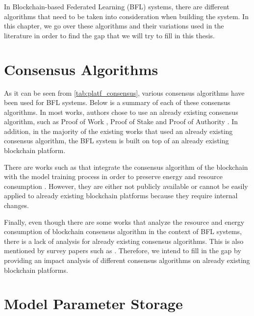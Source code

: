 In Blockchain-based Federated Learning (BFL) systems, there are different algorithms that need to be taken into consideration when building the system. In this chapter, we go over these algorithms and their variations used in the literature in order to find the gap that we will try to fill in this thesis.

\section{Consensus Algorithms}\label{related_work:consensus_algorithms}

As it can be seen from \autoref{tab:platf_consensus}, various consensus algorithms have been used for BFL systems. Below is a summary of each of these consensus algorithms. In most works, authors chose to use an already existing consensus algorithm, such as Proof of Work \cite{10.48550/arxiv.2007.03856, 9233457, 8733825, 10.48550/arxiv.2112.07938, 9134967, 10.48550/arxiv.1912.04859, 9079513, 9223754, 9399813}, Proof of Stake \cite{9159643, 10.48550/arxiv.2101.03300, 8998397, 10.48550/arxiv.1912.04859, 9399813, 9170559, 9311394, 9170905} and Proof of Authority \cite{9274451, baffle, demo, 8945913}. In addition, in the majority of the existing works that used an already existing consensus algorithm, the BFL system is built on top of an already existing blockchain platform.

There are works such as \cite{9347812, 10.48550/arxiv.2007.15145, 8843900} that integrate the consensus algorithm of the blockchain with the model training process in order to preserve energy and resource consumption \cite{9293091}. However, they are either not publicly available or cannot be easily applied to already existing blockchain platforms because they require internal changes.

Finally, even though there are some works that analyze the resource and energy consumption of blockchain consensus algorithm in the context of BFL systems, there is a lack of analysis for already existing consensus algorithms. This is also mentioned by survey papers such as \cite{9403374, 10.48550/arxiv.2112.07938}. Therefore, we intend to fill in the gap by providing an impact analysis of different consensus algorithms on already existing blockchain platforms.

\section{Model Parameter Storage}\label{related_work:param_storage}

